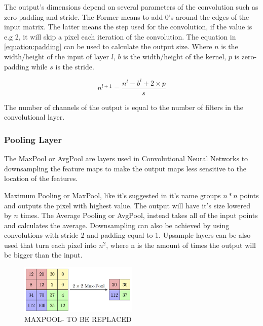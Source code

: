 The output's dimensions depend on several parameters of the convolution such as zero-padding and stride. The Former means to add 0's around the edges
of the input matrix. The latter means the step used for the convolution, if the value is e.g 2, it will skip a pixel each iteration of the convolution.
The equation in \ref{equation:padding} can be used to calculate the output size. Where $n$ is the width/height of the input of layer $l$,
$ b$ is the width/height of the kernel, $p$ is  zero-padding while $s$ is the stride.

\begin{equation} \label{equation:padding}
     n^{l+1} = \frac{n^{l}- b^{l}+2 \times p}{s}
\end{equation}

The number of channels of the output is equal to the number of filters
in the convolutional layer.




\subsubsection{Pooling Layer}

The MaxPool or AvgPool are layers used in Convolutional Neural Networks to downsampling the feature maps to make 
the output maps less sensitive to the location of the features.

Maximum Pooling or MaxPool, like it's suggested in it's name groups $ n * n $ points and outputs the pixel with highest value.
 The output will have it's size lowered by $ n $ times.
The Average Pooling or AvgPool, instead takes all of the input points and calculates the average. Downsampling can also be achieved by using convolutions with stride 2 and padding equal to 1.
Upsample layers can be also used that turn each pixel into $ n^{2} $, where n is the amount of times the output will be bigger than the input.

\begin{figure}[!htbp]
    \centering
    \includegraphics[width=0.5\textwidth]{Figures/maxpool.png}
    \caption{MAXPOOL- TO BE REPLACED}
    \label{figure:maxpool}
\end{figure} 
 

